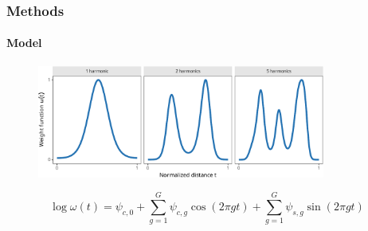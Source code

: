 \documentclass{snedecorbeamer}
\begin{document}
\begin{frame}
  \frametitle{Methods}
  \framesubtitle{Model}








  \begin{figure}
    \centering
    \includegraphics[height=10em]{inc/few_weight_profiles}
  \end{figure}

  \begin{equation}
    \log\omega(t)
    \label{eq:few-log}
    =\psi_{c,0} + \sum_{g = 1}^{G} \psi_{c,g}\cos\left(2\pi gt\right)
      + \sum_{g = 1}^{G} \psi_{s,g}\sin\left(2\pi gt\right)
  \end{equation}

\end{frame}
\end{document}
